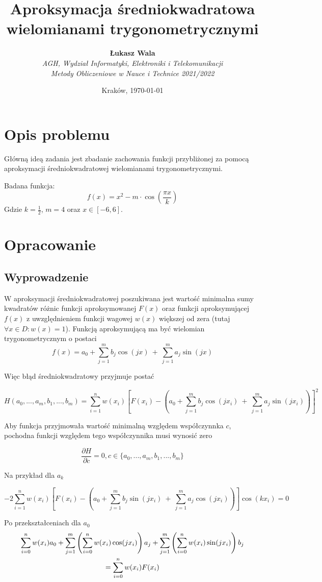 \documentclass{article}
\title{Aproksymacja średniokwadratowa wielomianami trygonometrycznymi}
\author{\textbf{Łukasz Wala}\\
    \textit{AGH, Wydział Informatyki, Elektroniki i Telekomunikacji} \\
    \textit{Metody Obliczeniowe w Nauce i Technice 2021/2022}}
\date{Kraków, \today}
\begin{document}
\maketitle

\section{Opis problemu}
Główną ideą zadania jest zbadanie zachowania funkcji przybliżonej za pomocą aproksymacji
średniokwadratowej wielomianami trygonometrycznymi.

Badana funkcja:
\[f(x)=x^2-m\cdot\cos\left(\frac{\pi x}{k}\right)\]
Gdzie $k=\frac{1}{2}$, $m=4$ oraz $x\in [-6,6]$.

\section{Opracowanie}
\subsection{Wyprowadzenie}
W aproksymacji średniokwadratowej poszukiwana jest wartość minimalna sumy kwadratów różnic funkcji aproksymowanej $F(x)$
oraz funkcji aproksymującej $f(x)$ z uwzględnieniem funkcji wagowej $w(x)$ większej od zera (tutaj $\forall x \in D
:w(x) = 1$). Funkcją aproksymującą ma być wielomian trygonometrycznym o postaci
$$\displaystyle f(x) = a_0 + \sum_{j=1}^mb_j\cos(jx)\:+\:\sum_{j=1}^m a_j\sin(jx)$$

Więc błąd średniokwadratowy przyjmuje postać

$$\displaystyle H(a_0, ..., a_m, b_1, ..., b_m)=\sum_{i=1}^nw(x_i)\left[F(x_i)-(a_0 + \sum_{j=1}^mb_j\cos(jx_i)\:+\:\sum_{j=1}^m a_j\sin(jx_i))\right]^2$$

Aby funkcja przyjmowała wartość minimalną względem współczynnka $c$, pochodna funkcji względem tego współczynnika musi
wynosić zero

$$\frac{\partial H}{\partial c}=0, c \in \{a_0, ..., a_m, b_1, ..., b_m\}$$

Na przykład dla $a_k$

$$\displaystyle -2\sum_{i=1}^nw(x_i)\left[F(x_i)-(a_0 + \sum_{j=1}^mb_j\sin(jx_i)\:+\:\sum_{j=1}^m a_j\cos(jx_i))\right]\cos(kx_i) = 0$$

Po przekształceniach dla $a_0$
\begin{multline*}
    $$\displaystyle \sum_{i=0}^nw(x_i)a_0+\sum_{j=1}^m\left(\sum_{i=0}^nw(x_i)\cos(jx_i)\right)a_j+
    \sum_{j=1}^m\left(\sum_{i=0}^nw(x_i)\sin(jx_i)\right)b_j \\=\sum_{i=0}^nw(x_i)F(x_i)$$
\end{multline*}
\end{document}
